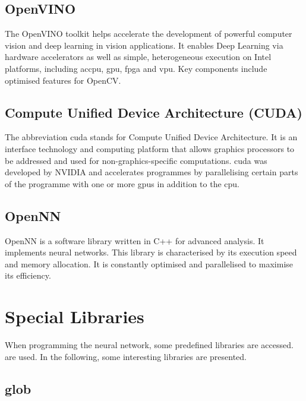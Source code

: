 \subsection{OpenVINO}

The OpenVINO toolkit helps accelerate the development of powerful computer vision and deep learning in vision applications. It enables Deep Learning via hardware accelerators as well as simple, heterogeneous execution on Intel platforms, including ac{cpu}, \ac{gpu}, \ac{fpga} and \ac{vpu}. Key components include optimised features for OpenCV.
\cite{IntelRequirements:2019,OpenVino:2020}

\subsection{ Compute Unified Device Architecture (CUDA)}



The abbreviation \ac{cuda} stands for Compute Unified Device Architecture. It is an interface technology and computing platform that allows graphics processors to be addressed and used for non-graphics-specific computations. \ac{cuda} was developed by NVIDIA and accelerates programmes by parallelising certain parts of the programme with one or more \ac{gpu}s in addition to the \ac{cpu}. \cite{Tan:2019,CUDA:2020,CUDATK:2020} 

\subsection{OpenNN}

OpenNN is a software library written in C++ for advanced analysis. It implements neural networks.
This library is characterised by its execution speed and memory allocation. It is constantly optimised and parallelised to maximise its efficiency. \cite{OpenNN:2020}





\section{Special Libraries}

When programming the neural network, some predefined libraries are accessed. 
are used. In the following, some interesting libraries are presented.

\subsection{glob}

